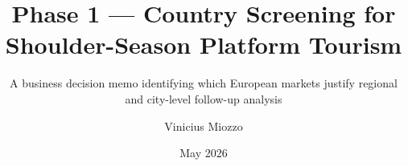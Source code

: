 \documentclass[11pt,a4paper]{article}
\title{Phase 1 --- Country Screening for Shoulder-Season Platform Tourism}
\subtitle{A business decision memo identifying which European markets justify regional and city-level follow-up analysis}
\author{Vinicius Miozzo}
\date{May 2026}
\begin{document}
\maketitlepage
\tableofcontents
\clearpage






\end{document}
